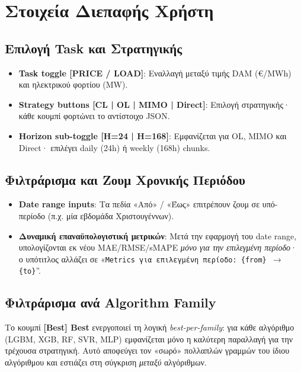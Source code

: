 \section{Στοιχεία Διεπαφής Χρήστη}
\label{sec:dash_ui}

\subsection*{Επιλογή Task και Στρατηγικής}

\begin{itemize}
    \item \textbf{Task toggle [PRICE / LOAD]}: Εναλλαγή μεταξύ τιμής DAM
    (€/MWh) και ηλεκτρικού φορτίου (MW).
    \item \textbf{Strategy buttons [CL | OL | MIMO | Direct]}: Επιλογή
    στρατηγικής· κάθε κουμπί φορτώνει το αντίστοιχο JSON.
    \item \textbf{Horizon sub-toggle [H=24 | H=168]}: Εμφανίζεται για
    OL, MIMO και Direct· επιλέγει daily (24h) ή weekly (168h) chunks.
\end{itemize}

\subsection*{Φιλτράρισμα και Ζουμ Χρονικής Περιόδου}

\begin{itemize}
    \item \textbf{Date range inputs}: Τα πεδία «Από» / «Έως» επιτρέπουν
    ζουμ σε υπό-περίοδο (π.χ. μία εβδομάδα Χριστουγέννων).
    \item \textbf{Δυναμική επαναϋπολογιστική μετρικών}: Μετά την εφαρμογή
    του date range, υπολογίζονται εκ νέου MAE/RMSE/sMAPE \textit{μόνο για
    την επιλεγμένη περίοδο}· ο υπότιτλος αλλάζει σε
    «\texttt{Metrics για επιλεγμένη περίοδο: \{from\} $\to$ \{to\}}''.
\end{itemize}

\subsection*{Φιλτράρισμα ανά Algorithm Family}

Το κουμπί \textbf{[Best] Best} ενεργοποιεί τη λογική \textit{best-per-family}:
για κάθε αλγόριθμο (LGBM, XGB, RF, SVR, MLP) εμφανίζεται μόνο η καλύτερη
παραλλαγή για την τρέχουσα στρατηγική. Αυτό αποφεύγει τον «σωρό» πολλαπλών
γραμμών του ίδιου αλγόριθμου και εστιάζει στη σύγκριση \textit{μεταξύ}
αλγόριθμων.

